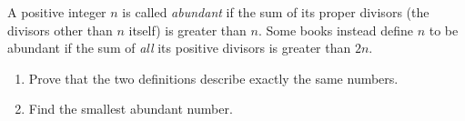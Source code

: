A positive integer $n$ is called \emph{abundant} if the sum of its proper divisors (the divisors other than $n$ itself) is greater than $n$. Some books instead define $n$ to be abundant if the sum of \emph{all} its positive divisors is greater than $2n$.
\begin{enumerate}
\item[(a)] Prove that the two definitions describe exactly the same numbers.
\item[(b)] Find the smallest abundant number.
\end{enumerate}
